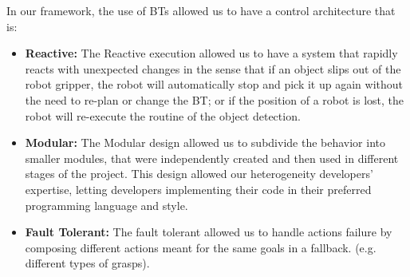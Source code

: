%
%
%
%
%
%
In our framework, the use of BTs allowed us to have a control architecture that is:

\begin{itemize}
\item \textbf{Reactive:} The Reactive execution allowed us to have a system that rapidly reacts with unexpected changes in the sense that if an object slips out of the robot gripper, the robot will automatically stop and pick it up again without the need to re-plan or change the BT; or if the position of a robot is lost, the robot will re-execute the routine of the object detection.
\item \textbf{Modular:} The Modular design allowed us to subdivide the behavior into smaller modules, that were independently created and then used in different stages of the project. This design allowed our heterogeneity developers’ expertise, letting developers implementing their code in their preferred programming language and style.
\item \textbf{Fault Tolerant:} The fault tolerant allowed us to handle actions failure by composing different actions meant for the same goals in a fallback. (e.g. different types of grasps).
\end{itemize}



